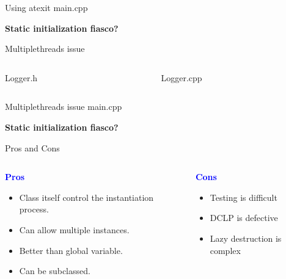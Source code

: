 \documentclass[13pt]{beamer}
\begin{document}
\begin{frame}{Using atexit}
main.cpp
\lstset{basicstyle=\tiny,style=myCustomCppStyle}

\textbf{Static initialization fiasco?}
\end{frame}

\begin{frame}{Multiplethreads issue}
\begin{columns}[T]
\begin{column}{.48\textwidth}
Logger.h
\lstset{basicstyle=\tiny,style=myCustomCppStyle}

\end{column}

\begin{column}{.48\textwidth}
Logger.cpp
\lstset{basicstyle=\tiny,style=myCustomCppStyle}

\end{column}
\end{columns}
\end{frame}

\begin{frame}{Multiplethreads issue}
main.cpp
\lstset{basicstyle=\tiny,style=myCustomCppStyle}

\textbf{Static initialization fiasco?}
\end{frame}

\begin{frame}{Pros and Cons}
\begin{columns}[T]
\begin{column}{.48\textwidth}
	\begin{center}
	\textcolor{blue}{\textbf{Pros}}
	\end{center}
	\begin{itemize}
		\setlength\itemsep{1em}
		\item Class itself control the instantiation process.
		\item Can allow multiple instances.
		\item Better than global variable.
		\item Can be subclassed.
	\end{itemize}
\end{column}
\begin{column}{.48\textwidth}
	\begin{center}
	\textcolor{blue}{\textbf{Cons}}
	\end{center}
		\begin{itemize}
		\setlength\itemsep{1em}
		\item Testing is difficult
		\item DCLP is defective
		\item Lazy destruction is complex
	\end{itemize}
\end{column}
\end{columns}
\end{frame}
\end{document}
